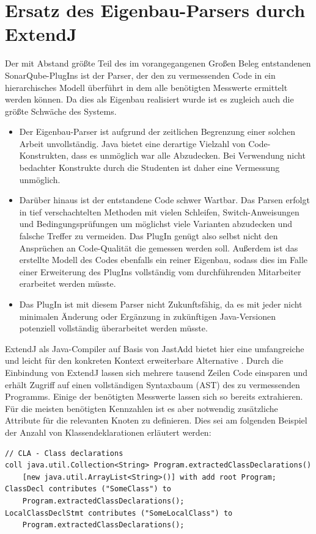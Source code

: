 \documentclass[da,ngerman]{stthesis}
\begin{document}
		\section{Ersatz des Eigenbau-Parsers durch ExtendJ} \label{extendjeinbau}
			Der mit Abstand größte Teil des im vorangegangenen Großen Beleg entstandenen SonarQube-PlugIns ist der Parser, der den zu vermessenden Code in ein hierarchisches Modell überführt in dem alle benötigten Messwerte ermittelt werden können. Da dies als Eigenbau realisiert wurde ist es zugleich auch die größte Schwäche des Systems. 
			\begin{itemize}
				\item Der Eigenbau-Parser ist aufgrund der zeitlichen Begrenzung einer solchen Arbeit unvollständig. Java bietet eine derartige Vielzahl von Code-Konstrukten, dass es unmöglich war alle Abzudecken. Bei Verwendung nicht bedachter Konstrukte durch die Studenten ist daher eine Vermessung unmöglich.
				\item Darüber hinaus ist der entstandene Code schwer Wartbar. Das Parsen erfolgt in tief verschachtelten Methoden mit vielen Schleifen, Switch-Anweisungen und Bedingungsprüfungen um möglichst viele Varianten abzudecken und falsche Treffer zu vermeiden. Das PlugIn genügt also selbst nicht den Ansprüchen an Code-Qualität die gemessen werden soll. Außerdem ist das erstellte Modell des Codes ebenfalls ein reiner Eigenbau, sodass dies im Falle einer Erweiterung des PlugIns vollständig vom durchführenden Mitarbeiter erarbeitet werden müsste.
				\item Das PlugIn ist mit diesem Parser nicht Zukunftsfähig, da es mit jeder nicht minimalen Änderung oder Ergänzung in zukünftigen Java-Versionen potenziell vollständig überarbeitet werden müsste.
			\end{itemize}
			ExtendJ als Java-Compiler auf Basis von JastAdd bietet hier eine umfangreiche und leicht für den konkreten Kontext erweiterbare Alternative \cite{ExtendJ}. Durch die Einbindung von ExtendJ lassen sich mehrere tausend Zeilen Code einsparen und erhält Zugriff auf einen vollständigen Syntaxbaum (AST) des zu vermessenden Programms. Einige der benötigten Messwerte lassen sich so bereits extrahieren. Für die meisten benötigten Kennzahlen ist es aber notwendig zusätzliche Attribute für die relevanten Knoten zu definieren. Dies sei am folgenden Beispiel der Anzahl von Klassendeklarationen erläutert werden:
			\begin{lstlisting}
// CLA - Class declarations
coll java.util.Collection<String> Program.extractedClassDeclarations()
	[new java.util.ArrayList<String>()] with add root Program;
ClassDecl contributes ("SomeClass") to
	Program.extractedClassDeclarations();
LocalClassDeclStmt contributes ("SomeLocalClass") to
	Program.extractedClassDeclarations();
			\end{lstlisting}
\end{document}
